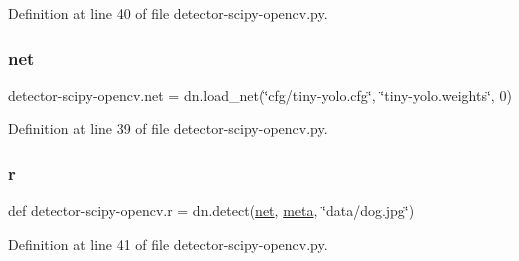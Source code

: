 Definition at line 40 of file detector-\/scipy-\/opencv.\+py.

\mbox{\label{namespacedetector-scipy-opencv_a5e661955bb33e5ddd0c20e700ef246b1}} 
\subsubsection{\texorpdfstring{net}{net}}
{\footnotesize\ttfamily detector-\/scipy-\/opencv.\+net = dn.\+load\+\_\+net(\char`\"{}cfg/tiny-\/yolo.\+cfg\char`\"{}, \char`\"{}tiny-\/yolo.\+weights\char`\"{}, 0)}



Definition at line 39 of file detector-\/scipy-\/opencv.\+py.

\mbox{\label{namespacedetector-scipy-opencv_a454d4a9590e11c36c21186a87d98a199}} 
\subsubsection{\texorpdfstring{r}{r}}
{\footnotesize\ttfamily def detector-\/scipy-\/opencv.\+r = dn.\+detect(\mbox{\hyperlink{namespacedetector-scipy-opencv_a5e661955bb33e5ddd0c20e700ef246b1}{net}}, \mbox{\hyperlink{namespacedetector-scipy-opencv_aefa8c13d2324512c8b50817683901197}{meta}}, \char`\"{}data/dog.\+jpg\char`\"{})}



Definition at line 41 of file detector-\/scipy-\/opencv.\+py.

